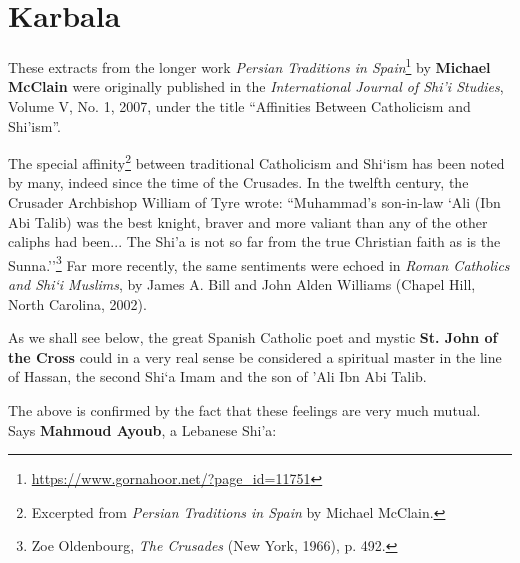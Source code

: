 \section{Karbala}

\begin{quotex}
These extracts from the longer work \emph{Persian Traditions in Spain}\footnote{\url{https://www.gornahoor.net/?page\_id=11751}} by \textbf{Michael McClain} were originally published in the
\emph{International Journal of Shi'i Studies}, Volume V, No. 1, 2007, under the title ``Affinities Between Catholicism and Shi'ism''.
\end{quotex}

The special affinity\footnote{Excerpted from \emph{Persian Traditions in Spain} by Michael McClain.} between traditional Catholicism and Shi`ism has been noted by many, indeed since the time of the Crusades. In the twelfth century, the Crusader Archbishop William of Tyre wrote: ``Muhammad's son-in-law `Ali (Ibn Abi Talib) was the best knight, braver and more valiant than any of the other caliphs had been... The Shi'a is not so far from the true Christian faith as is the Sunna.''\footnote{Zoe Oldenbourg, \emph{The Crusades} (New York, 1966), p. 492.} Far more recently, the same sentiments were echoed in \emph{Roman Catholics and Shi`i Muslims}, by James A. Bill and John Alden Williams (Chapel Hill, North Carolina, 2002).

As we shall see below, the great Spanish Catholic poet and mystic \textbf{St. John of the Cross} could in a very real sense be considered a spiritual master in the line of Hassan, the second Shi`a Imam and the son of 'Ali Ibn Abi Talib.

The above is confirmed by the fact that these feelings are very much mutual. Says \textbf{Mahmoud Ayoub}, a Lebanese Shi'a:

